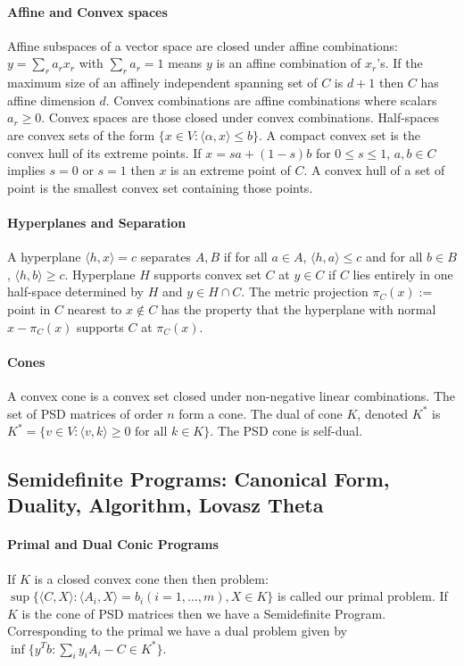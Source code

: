 \documentclass[letterpaper,11pt,oneside,onecolumn]{article}
\begin{document}
\paragraph{Affine and Convex spaces} Affine subspaces of a vector space are closed under affine combinations: $y = \sum_r a_r x_r$ with $\sum_r a_r =1$ means $y$ is an affine combination of $x_r$'s. If the maximum size of an affinely independent spanning set of $C$ is $d+1$ then $C$ has affine dimension $d$. Convex combinations are affine combinations where scalars $a_r \geq 0$. Convex spaces are those closed under convex combinations. Half-spaces are convex sets of the form $\{x \in V: \langle \alpha, x \rangle \leq b\}$. A compact convex set is the convex hull of its extreme points. If $x = sa + (1-s)b$ for $0\leq s \leq 1$, $a,b \in C$ implies $s=0$ or $s=1$ then $x$ is an extreme point of $C$. A convex hull of a set of point is the smallest convex set containing those points.
\paragraph{Hyperplanes and Separation}
A hyperplane $\langle h, x\rangle = c$ separates $A,B$ if for all $a \in A$, $\langle h, a\rangle \leq c$ and for all $b \in B$, $\langle h, b \rangle \geq c$. Hyperplane $H$ supports convex set $C$ at $y \in C$ if $C$ lies entirely in one half-space determined by $H$ and $y \in H \cap C$. The metric projection $\pi_C(x) :=$ point in $C$ nearest to $x \not\in C$ has the property that the hyperplane with normal $x - \pi_C(x)$ supports $C$ at $\pi_C(x)$.
\paragraph{Cones} A convex cone is a convex set closed under non-negative linear combinations. The set of PSD matrices of order $n$ form a cone. The dual of cone $K$, denoted $K^*$ is $K^*=\{v \in V: \langle v,k \rangle \geq 0 \text{ for all } k \in K \}$. The PSD cone is self-dual.
\subsection*{Semidefinite Programs: Canonical Form, Duality, Algorithm, Lovasz Theta}
\paragraph{Primal and Dual Conic Programs} If $K$ is a closed convex cone then then problem:
$\sup \{\langle C, X \rangle : \langle A_i, X \rangle = b_i (i=1,\dots, m), X \in K \} $ is called our primal problem. If $K$ is the cone of PSD matrices then we have a Semidefinite Program. Corresponding to the primal we have a dual problem given by $\inf \{ y^Tb : \sum_i y_iA_i - C \in K^*\}.$
\end{document}
